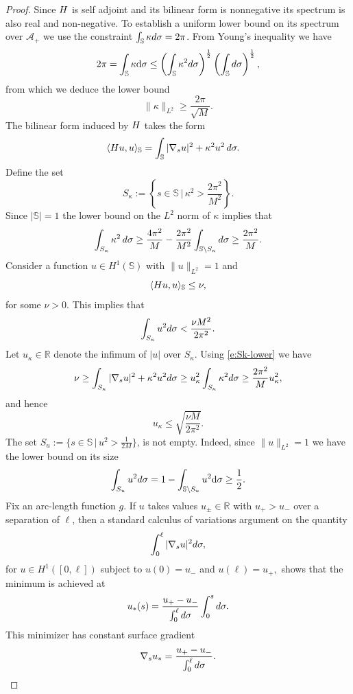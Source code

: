 \documentclass[10pt,a4paper]{amsart}
\def\cA{{\mathcal A}}
\def\mbbR{\mathbb{R}}
\def\mbbS{\mathbb{S}}
\def\mrH{\textrm H}
\def\mrd{\textrm d}
\def\rmd{\mathrm d}
\newcommand{\beq}{\begin{equation}}
\newcommand{\eeq}{\end{equation}}
\begin{document}
\begin{proof}
Since $\mrH$ is self adjoint and its bilinear form is nonnegative its spectrum is also real and non-negative. 
To establish a uniform lower  bound on its spectrum over $\cA_+$ we use the constraint $\int_\mbbS \kappa\mrd \sigma= 2\pi$. 
From Young's inequality we have
$$\begin{aligned}
2\pi =\int_\mbbS \kappa  \rmd \sigma &\leq \left(\int_\mbbS\kappa^2\mrd\sigma\right)^\frac12 \left(\int_\mbbS\mrd\sigma\right)^\frac12,\\
\end{aligned}
$$
from which we deduce the lower bound
$$
\| \kappa \|_{L^2} \geq  \frac{2\pi}{\sqrt{M}}.
$$
The bilinear form induced by $\mrH$ takes the form
$$\begin{aligned}
    \langle \mrH u, u\rangle_\mbbS&=\int_\mbbS |\nabla_s u|^2+\kappa^2u^2 \,\mrd \sigma.
\end{aligned}$$
 Define the set 
 $$S_\kappa:=\left\{s\in\mbbS\,\bigl|\,\kappa^2>\frac{2\pi^2}{M^2}\right\}.$$ 
 Since $|\mbbS|=1$ the lower bound on the $L^2$ norm of $\kappa$ implies that
\beq\label{e:Sk-lower}\int_{S_\kappa}\kappa^2\,\mrd\sigma \ge \frac{4\pi^2}{M}-\frac{2\pi^2}{M^2}\int_{\mbbS\backslash S_\kappa} \mrd\sigma \geq \frac{2\pi^2}{M}.\eeq
Consider a function $u\in H^1(\mbbS)$
with $\|u\|_{L^2}=1$ and
$$  \langle \mrH u, u\rangle_\mbbS\leq \nu,$$
for some $\nu>0.$
This implies that
$$ \int_{S_\kappa} u^2\mrd \sigma<\frac{\nu M^2}{2\pi^2}.$$
Let $u_\kappa\in\mbbR$ denote the infimum of $|u|$ over $S_\kappa.$ Using \eqref{e:Sk-lower} we have
$$ \nu\geq \int_{S_\kappa} |\nabla_s u|^2+\kappa^2 u^2\mrd \sigma \geq u_\kappa^2 \int_{S_\kappa}\kappa^2\mrd\sigma\geq  \frac{2\pi^2}{M} u_\kappa^2,$$
and hence
$$ u_\kappa\leq \sqrt{\frac{\nu M}{2\pi^2}}.$$
The set $S_u:=\{s\in\mbbS\,\bigl|\, u^2>\frac{1}{2M}\}$, is not empty. Indeed, since $\|u\|_{L^2}=1$ we have the lower bound on its size 
$$ \int_{S_u} u^2\mrd \sigma=1-\int_{\mbbS\backslash S_u}u^2\rmd \sigma \geq \frac12.$$
Fix an  arc-length function $g$. If $u$ takes values $u_\pm\in\mbbR$ with $u_+>u_-$ over a separation of $\ell$, then a standard calculus of variations argument on the quantity
$$ \int_0^\ell |\nabla_s u|^2\mrd \sigma,$$
for $u\in H^1([0,\ell])$ subject to $u(0)=u_-$ and $u(\ell)=u_+,$ shows that the minimum is achieved at
$$ u_*(s) =\frac{u_+-u_-}{\int_0^\ell\mrd\sigma}\int_0^s\mrd\sigma.$$
This minimizer has constant surface gradient
$$\nabla_s u_* =\frac{u_+-u_-}{\int_0^\ell\mrd\sigma}.$$

\end{proof}
\end{document}
